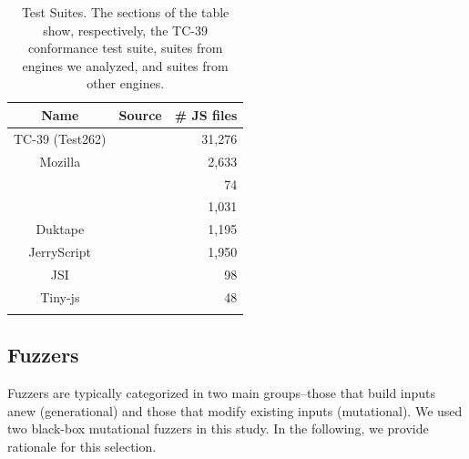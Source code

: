 \documentclass[10pt,conference,anonymous]{IEEEtran}
\begin{document}
\begin{table}[t]
  \centering
  \caption{\label{tab:test-suites}Test Suites. The sections of the
    table show, respectively, the TC-39 conformance test suite, suites
    from engines we analyzed, and suites from other engines.}
  \begin{tabular}{ccr}
    \toprule
    Name & Source & \# JS files \\
    \midrule
    TC-39 (Test262) & \cite{ecma262-conformance-suite} & 31,276 \\
    \midrule
    Mozilla & \cite{mozilla} & 2,633 \\
    \veight{} & \cite{v8} & 74 \\
    \jsc{} & \cite{webkit} & 1,031 \\
    \midrule    
    Duktape & \cite{duktape} & 1,195 \\ 
    JerryScript & \cite{jerryscript} & 1,950 \\
    JSI & \cite{jsi} & 98 \\
    Tiny-js & \cite{tinyjs} & 48 \\    
    \midrule
     &  & \totalTestFiles{} \\
   \bottomrule     
  \end{tabular}
\end{table}


\subsection{Fuzzers}
\label{sec:objects:fuzzers}


Fuzzers are typically categorized in two main groups--those that build
inputs anew (generational) and those that modify existing inputs
(mutational). We used two black-box mutational
fuzzers
in this study. In the following, we provide rationale for this
selection.
\end{document}
